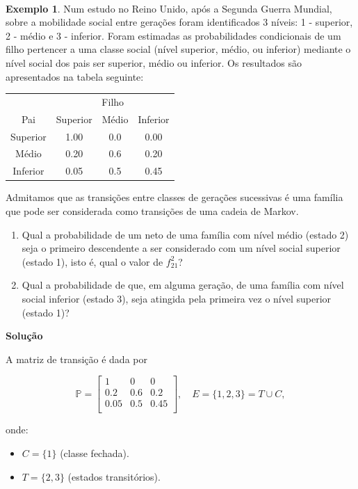 \documentclass[
  11pt,
  a4paper,
]{book}
\theoremstyle{definition}
\theoremstyle{definition}
\newtheorem{example}{Exemplo}[chapter]
\theoremstyle{definition}
\theoremstyle{definition}
\theoremstyle{remark}
\begin{document}
\(\,\)

\begin{example}
Num estudo no Reino Unido, após a Segunda Guerra Mundial, sobre a mobilidade social entre gerações foram identificados 3 níveis: 1 - superior, 2 - médio e 3 - inferior. Foram estimadas as probabilidades condicionais de um filho pertencer a uma classe social (nível superior, médio, ou inferior) mediante o nível social dos pais ser superior, médio ou inferior. Os resultados são apresentados na tabela seguinte:

\begin{tabular}{cccc}
\toprule
\multicolumn{1}{c}{ } & \multicolumn{3}{c}{Filho} \\
\cmidrule(l{3pt}r{3pt}){2-4}
Pai & Superior & Médio & Inferior\\
\midrule
Superior & 1.00 & 0.0 & 0.00\\
Médio & 0.20 & 0.6 & 0.20\\
Inferior & 0.05 & 0.5 & 0.45\\
\bottomrule
\end{tabular}

Admitamos que as transições entre classes de gerações sucessivas é uma família que pode ser considerada como transições de uma cadeia de Markov.

\begin{enumerate}
\def\labelenumi{\arabic{enumi}.}
\item
  Qual a probabilidade de um neto de uma família com nível médio (estado 2) seja o primeiro descendente a ser considerado com um nível social superior (estado 1), isto é, qual o valor de \(f_{21}^2\)?
\item
  Qual a probabilidade de que, em alguma geração, de uma família com nível social inferior (estado 3), seja atingida pela primeira vez o nível superior (estado 1)?
\end{enumerate}

\textbf{Solução}

A matriz de transição é dada por

\[
\mathbb{P} =
\begin{bmatrix}
1 & 0 & 0   \\
0.2 & 0.6 & 0.2  \\
0.05 & 0.5 & 0.45 \\
\end{bmatrix}, \quad E = \{1,2,3\} = T \cup C,
\]

onde:

\begin{itemize}
\item
  \(C = \{1\}\) (classe fechada).
\item
  \(T = \{2,3\}\) (estados transitórios).
\end{itemize}


\end{example}
\end{document}

